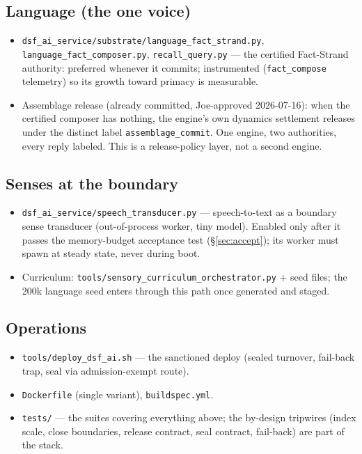 \documentclass[11pt]{article}
\begin{document}
\subsection{Language (the one voice)}
\begin{itemize}[nosep]
  \item \texttt{dsf\_ai\_service/substrate/language\_fact\_strand.py},
        \texttt{language\_fact\_composer.py},
        \texttt{recall\_query.py} — the certified Fact-Strand authority:
        preferred whenever it commits; instrumented (\texttt{fact\_compose}
        telemetry) so its growth toward primacy is measurable.
  \item Assemblage release (already committed, Joe-approved 2026-07-16):
        when the certified composer has nothing, the engine's own dynamics
        settlement releases under the distinct label
        \texttt{assemblage\_commit}. One engine, two authorities, every
        reply labeled. This is a release-policy layer, not a second engine.
\end{itemize}

\subsection{Senses at the boundary}
\begin{itemize}[nosep]
  \item \texttt{dsf\_ai\_service/speech\_transducer.py} — speech-to-text as
        a boundary sense transducer (out-of-process worker, tiny model).
        Enabled only after it passes the memory-budget acceptance test
        (\S\ref{sec:accept}); its worker must spawn at steady state, never
        during boot.
  \item Curriculum: \texttt{tools/sensory\_curriculum\_orchestrator.py} +
        seed files; the 200k language seed enters through this path once
        generated and staged.
\end{itemize}

\subsection{Operations}
\begin{itemize}[nosep]
  \item \texttt{tools/deploy\_dsf\_ai.sh} — the sanctioned deploy (sealed
        turnover, fail-back trap, seal via admission-exempt route).
  \item \texttt{Dockerfile} (single variant), \texttt{buildspec.yml}.
  \item \texttt{tests/} — the suites covering everything above; the
        by-design tripwires (index scale, close boundaries, release
        contract, seal contract, fail-back) are part of the stack.
\end{itemize}
\end{document}
